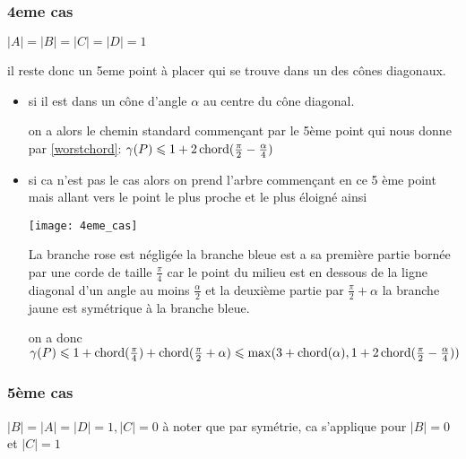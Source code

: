 \subsubsection*{4eme cas}\label{4cas} $|A| = |B| = |C| = |D| = 1$

il reste donc un 5eme point à placer qui se trouve dans un des cônes diagonaux.

\begin{itemize}

\item \label{4cas1} si il est dans un cône d'angle $\alpha$ au centre du cône diagonal.

on a alors le chemin standard commençant par le 5ème point qui nous donne par \ref{worstchord}: $\gamma(P) \leqslant 1 + 2\operatorname{chord}(\frac{\pi}{2} - \frac{\alpha}{4})$

\item \label{4cas2} si ca n'est pas le cas alors on prend l'arbre commençant en ce 5 ème point mais allant vers le point le plus proche et le plus éloigné ainsi

  \texttt{[image: 4eme\_cas]}

La branche rose est négligée
la branche bleue est a sa première partie bornée par une corde de taille $\frac{\pi}{4}$ car le point du milieu est en dessous de la ligne diagonal d'un angle au moins $\frac{\alpha}{2}$ et la deuxième partie par $\frac{\pi}{2} + \alpha$
la branche jaune est symétrique à la branche bleue.

on a donc $\gamma(P) \leqslant 1 + \operatorname{chord}(\frac{\pi}{4}) + \operatorname{chord}(\frac{\pi}{2} + \alpha) \leqslant \max(3 + \operatorname{chord}(\alpha), 1 + 2\operatorname{chord}(\frac{\pi}{2} - \frac{\alpha}{4}))$

\end{itemize}

\subsubsection*{5ème cas}\label{5cas} $|B| = |A| = |D| = 1, |C| = 0$
à noter que par symétrie, ca s'applique pour $|B| = 0$ et $|C| = 1$

